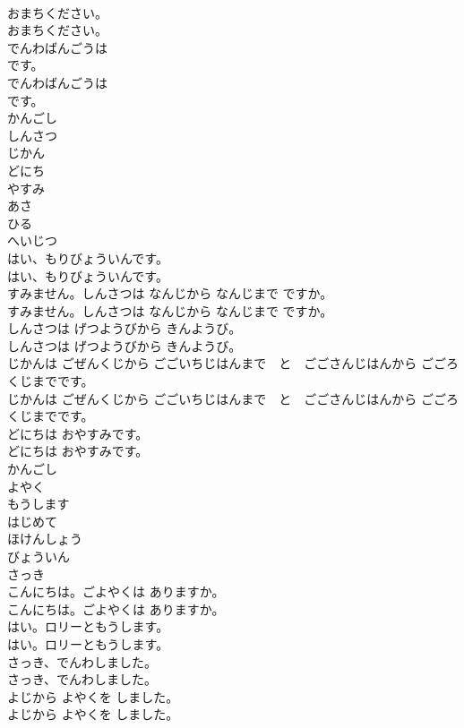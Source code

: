\documentclass[8pt]{extreport}
\begin{document}
\begin{CJK}{UTF8}{min}
\\	おまちください。	
\\	おまちください。 
\\	でんわばんごうは　
\\	です。	
\\	でんわばんごうは　
\\	です。　 
\\	かんごし
\\	しんさつ
\\	じかん
\\	どにち
\\	やすみ
\\	あさ
\\	ひる
\\	へいじつ
\\	はい、もりびょういんです。	
\\	はい、もりびょういんです。 
\\	すみません。しんさつは なんじから なんじまで ですか。	
\\	すみません。しんさつは なんじから なんじまで ですか。 
\\	しんさつは げつようびから きんようび。	
\\	しんさつは げつようびから きんようび。 
\\	じかんは ごぜんくじから ごごいちじはんまで　と　ごごさんじはんから ごごろくじまでです。	
\\	じかんは ごぜんくじから ごごいちじはんまで　と　ごごさんじはんから ごごろくじまでです。 
\\	どにちは おやすみです。	
\\	どにちは おやすみです。 
\\	かんごし
\\	よやく
\\	もうします
\\	はじめて
\\	ほけんしょう
\\	びょういん
\\	さっき
\\	こんにちは。ごよやくは ありますか。	
\\	こんにちは。ごよやくは ありますか。 
\\	はい。ロリーともうします。	
\\	はい。ロリーともうします。 
\\	さっき、でんわしました。	
\\	さっき、でんわしました。 
\\	よじから よやくを しました。	
\\	よじから よやくを しました。 

\end{CJK}
\end{document}
